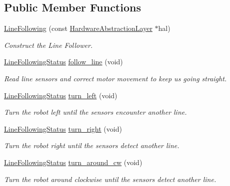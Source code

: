 \subsection*{Public Member Functions}
\begin{DoxyCompactItemize}
\item 
\hyperlink{classIDP_1_1LineFollowing_ab30cde971719545d81ce253ae995cc4d}{LineFollowing} (const \hyperlink{classIDP_1_1HardwareAbstractionLayer}{HardwareAbstractionLayer} $\ast$hal)
\begin{DoxyCompactList}\small\item\em Construct the Line Follower. \item\end{DoxyCompactList}\item 
\hyperlink{namespaceIDP_a5993bdfdd901fc5521c8df42dca43bd0}{LineFollowingStatus} \hyperlink{classIDP_1_1LineFollowing_ad26d7726d2bb263658ed3140d3e30852}{follow\_\-line} (void)
\begin{DoxyCompactList}\small\item\em Read line sensors and correct motor movement to keep us going straight. \item\end{DoxyCompactList}\item 
\hyperlink{namespaceIDP_a5993bdfdd901fc5521c8df42dca43bd0}{LineFollowingStatus} \hyperlink{classIDP_1_1LineFollowing_a551e979a503328c2f645a1af2798d940}{turn\_\-left} (void)
\begin{DoxyCompactList}\small\item\em Turn the robot left until the sensors encounter another line. \item\end{DoxyCompactList}\item 
\hyperlink{namespaceIDP_a5993bdfdd901fc5521c8df42dca43bd0}{LineFollowingStatus} \hyperlink{classIDP_1_1LineFollowing_adc0b67e4dc93dfef246cdde6190b0745}{turn\_\-right} (void)
\begin{DoxyCompactList}\small\item\em Turn the robot right until the sensors detect another line. \item\end{DoxyCompactList}\item 
\hyperlink{namespaceIDP_a5993bdfdd901fc5521c8df42dca43bd0}{LineFollowingStatus} \hyperlink{classIDP_1_1LineFollowing_a5bbdc1317ef04ea599a7d5583703660b}{turn\_\-around\_\-cw} (void)
\begin{DoxyCompactList}\small\item\em Turn the robot around clockwise until the sensors detect another line. \item\end{DoxyCompactList}\item 

\end{DoxyCompactItemize}
